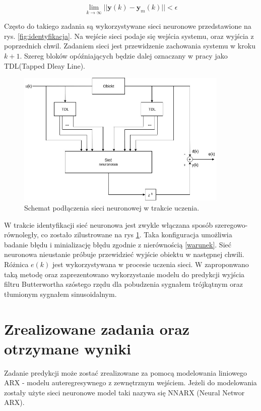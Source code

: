 \documentclass{article}
\newcommand{\bb}{\textbf}
\begin{document}
\begin{equation}
	\displaystyle{\lim_{k \to \infty}} ||\bb{y}(k)-\bb{y}_m(k)|| < \epsilon
\end{equation}

Często do takiego zadania są wykorzystywane sieci neuronowe przedstawione na rys. \ref{fig:identyfikacja}. Na wejście sieci podaje się wejścia systemu, oraz wyjścia z poprzednich chwil. Zadaniem sieci jest przewidzenie zachowania systemu w kroku $k+1$. Szereg bloków opóźniających będzie dalej oznaczany w pracy jako TDL(Tapped Dleay Line).

\begin{figure}
\centering
	\includegraphics[width=0.90\textwidth]{ident2.jpg}\par\vspace{1cm}
\caption{Schemat podłączenia sieci neuronowej w trakcie uczenia.}
	\label{fig:identyfikacja2}
\end{figure}

W trakcie identyfikacji sieć neuronowa jest zwykle włączana sposób szeregowo-równoległy, co zostało zilustrowane na rys \ref{fig:identyfikacja2}. Taka konfiguracja umożliwia badanie błędu i minializację błędu zgodnie z nierównością \ref{warunek}. Sieć neuronowa nieustanie próbuje przewidzieć wyjście obiektu w następnej chwili. Różnica $e(k)$ jest wykorzystywana w procesie uczenia sieci. W \cite{Osowski} zaproponwano taką metodę oraz zaprezentowano wykorzystanie modelu do predykcji wyjścia filtru Butterwortha szóstego rzędu dla pobudzenia sygnałem trójkątnym oraz tłumionym sygnałem sinusoidalnym.

\section{Zrealizowane zadania oraz otrzymane wyniki}
Zadanie predykcji może zostać zrealizowane za pomocą modelowania liniowego ARX -
modelu auteregresywnego z zewnętrznym wejściem. Jeżeli do modelowania zostały
użyte sieci neuronowe model taki nazywa się NNARX (Neural Networ ARX).
\end{document}
